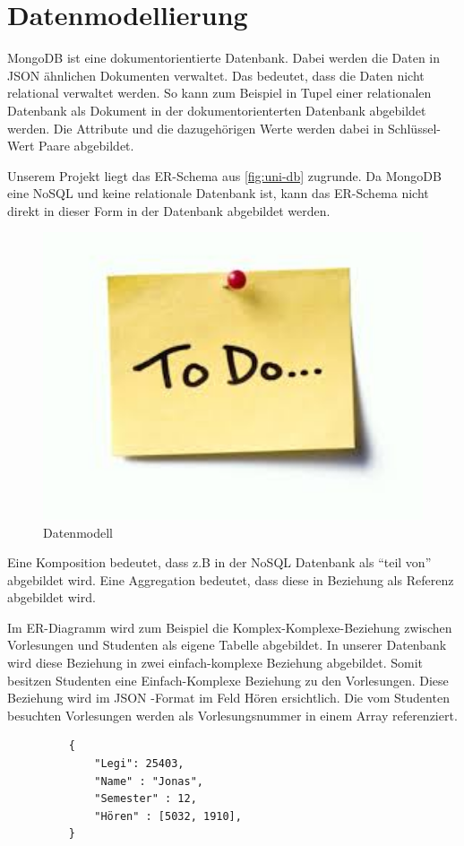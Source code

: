 \section{Datenmodellierung}
MongoDB ist eine dokumentorientierte Datenbank. Dabei werden die Daten in JSON
ähnlichen Dokumenten verwaltet. Das bedeutet, dass die Daten nicht relational
verwaltet werden. So kann zum Beispiel in Tupel einer relationalen Datenbank
als Dokument in der dokumentorienterten Datenbank abgebildet werden. Die
Attribute und die dazugehörigen Werte werden dabei in Schlüssel-Wert Paare
abgebildet. 

 Unserem Projekt liegt das ER-Schema aus \ref{fig:uni-db}
zugrunde.
Da MongoDB eine NoSQL und keine relationale Datenbank ist, kann das ER-Schema nicht direkt
in dieser Form in der Datenbank abgebildet werden. 

\begin{figure}[htbp]
  \centering
     \includegraphics[width=1\textwidth]{./pictures/todo.jpg}
  \caption{Datenmodell}
  \label{fig:usecase}
\end{figure}

Eine Komposition bedeutet, dass z.B in der NoSQL Datenbank als ``teil von''
abgebildet wird. Eine Aggregation bedeutet, dass diese in Beziehung  als
Referenz abgebildet wird.

Im ER-Diagramm wird zum Beispiel die Komplex-Komplexe-Beziehung zwischen 
Vorlesungen und Studenten als eigene Tabelle abgebildet. In unserer Datenbank
wird diese Beziehung in zwei einfach-komplexe Beziehung abgebildet. Somit
besitzen Studenten eine Einfach-Komplexe Beziehung zu den Vorlesungen.
Diese Beziehung wird im JSON -Format im Feld Hören ersichtlich. Die vom
Studenten besuchten Vorlesungen werden als Vorlesungsnummer in einem Array
referenziert.
\begin{figure}
	\begin{verbatim}
	{
		"Legi": 25403,
		"Name" : "Jonas",
		"Semester" : 12,
		"Hören" : [5032, 1910],
	}
	\end{verbatim}
	\label{cod:vorlesung}
\end{figure}



